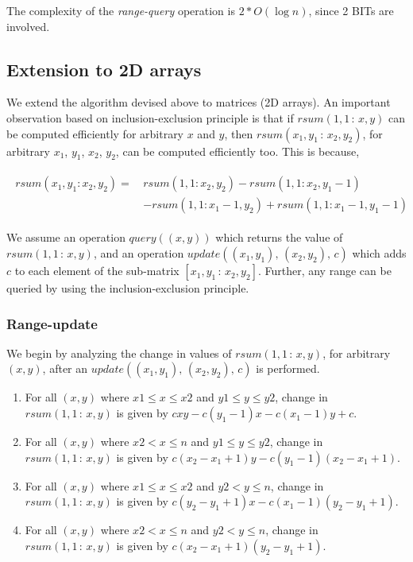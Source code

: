 \documentclass[a4paper]{article}
\begin{document}
\vspace{3 mm}
The complexity of the \textit{range-query} operation is $2*O(\log n)$, since 2 BITs are involved.



\subsection{Extension to 2D arrays}
We extend the algorithm devised above to matrices (2D arrays). An important observation based on inclusion-exclusion principle is that if $rsum(1, 1\, : \,x,y)$ can be computed efficiently for arbitrary $x$ and $y$, then $rsum(x_1, y_1 \,: \,x_2, y_2)$, for arbitrary $x_1$, $y_1$, $x_2$, $y_2$, can be computed efficiently too. This is because,

\vspace{-5 mm}
\begin{align}
\begin{split}
    rsum(x_1, y_1 : x_2, y_2) =\,& rsum(1, 1 : x_2, y_2)-rsum(1, 1 : x_2, y_1-1)\\
         & -rsum(1, 1 : x_1-1, y_2)+rsum(1, 1 : x_1-1, y_1-1)
\end{split}
\end{align}

We assume an operation $query( (x, y) )$ which returns the value of $rsum(1, 1\, : \,x,y)$, and an operation $update( (x_1, y_1),\, (x_2, y_2),\, c)$ which adds $c$ to each element of the sub-matrix $[x_1, y_1 \,:\, x_2, y_2]$. Further, any range can be queried by using the inclusion-exclusion principle.



\subsubsection{Range-update}
We begin by analyzing the change in values of $rsum(1, 1\, : \,x,y)$, for arbitrary $(x, y)$, after an $update( (x_1, y_1),\, (x_2, y_2),\, c)$ is performed.

\begin{enumerate}
\item For all $(x, y)$ where $x1 \leq x \leq x2$ and $y1 \leq y \leq y2$, change in $rsum(1, 1\, : \,x,y)$ is given by $cxy - c(y_1-1)x - c(x_1-1)y + c$.

\item For all $(x, y)$ where $x2 < x \leq n$ and $y1 \leq y \leq y2$, change in $rsum(1, 1\, : \,x,y)$ is given by $c(x_2-x_1+1)y - c(y_1-1)(x_2-x_1+1)$.

\item For all $(x, y)$ where $x1 \leq x \leq x2$ and $y2 < y \leq n$, change in $rsum(1, 1\, : \,x,y)$ is given by $c(y_2-y_1+1)x - c(x_1-1)(y_2-y_1+1)$.

\item For all $(x, y)$ where $x2 < x \leq n$ and $y2 < y \leq n$, change in $rsum(1, 1\, : \,x,y)$ is given by $c(x_2-x_1+1)(y_2-y_1+1)$.
\end{enumerate}
\end{document}
